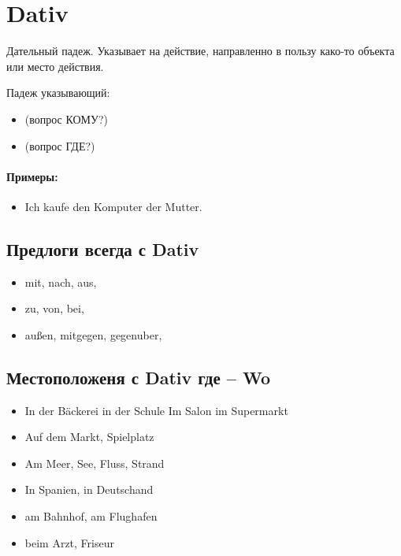 \section{Dativ}

Дательный падеж. Указывает на действие, направленно в пользу како-то объекта или место действия.

Падеж указывающий:
\begin{itemize}
 \item {} (вопрос КОМУ?)
 \item {} (вопрос ГДЕ?)
\end{itemize}

\paragraph{Примеры:}

\begin{itemize}
\item Ich kaufe den Komputer der Mutter.
~\\ 
\end{itemize}

\subsection{Предлоги всегда с Dativ}

\begin{itemize}
\item mit, nach, aus,
\item zu, von, bei,
\item außen, mitgegen, gegenuber,
\end{itemize}

\subsection{Местоположеня с Dativ где -- Wo}
\begin{itemize}
    \item In der Bäckerei in der Schule Im Salon im Supermarkt
    \item Auf dem Markt, Spielplatz
    \item Am Meer, See, Fluss, Strand
    \item In Spanien, in Deutschand
    \item am Bahnhof, am Flughafen
    \item beim Arzt, Friseur
\end{itemize}

